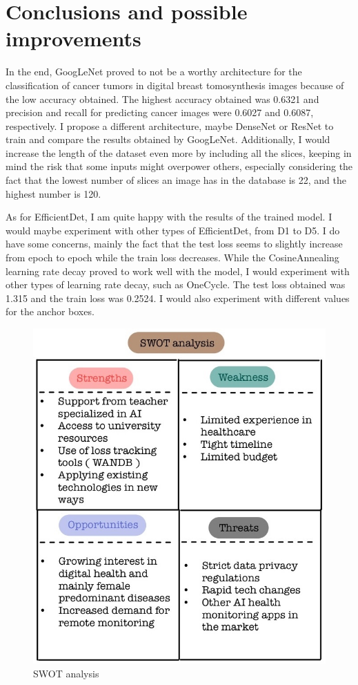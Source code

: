 \chapter{Conclusions and possible improvements}
\label{chap:ch6}

In the end, GoogLeNet proved to not be a worthy architecture for the classification of cancer tumors in digital breast tomosynthesis images because of the low accuracy obtained. The highest accuracy obtained was 0.6321 and precision and recall for predicting cancer images were 0.6027 and 0.6087, respectively. I propose a different architecture, maybe DenseNet or ResNet to train and compare the results obtained by GoogLeNet. Additionally, I would increase the length of the dataset even more by including all the slices, keeping in mind the risk that some inputs might overpower others, especially considering the fact that the lowest number of slices an image has in the database is 22, and the highest number is 120.

As for EfficientDet, I am quite happy with the results of the trained model. I would maybe experiment with other types of EfficientDet, from D1 to D5. I do have some concerns, mainly the fact that the test loss seems to slightly increase from epoch to epoch while the train loss decreases. While the CosineAnnealing learning rate decay proved to work well with the model, I would experiment with other types of learning rate decay, such as OneCycle. The test loss obtained was 1.315 and the train loss was 0.2524. I would also experiment with different values for the anchor boxes.

\begin{figure}
    \centering
    \includegraphics[width=0.5\linewidth]{figures/Figure54.png}
    \caption{SWOT analysis}
    \label{fig:fig44}
\end{figure}